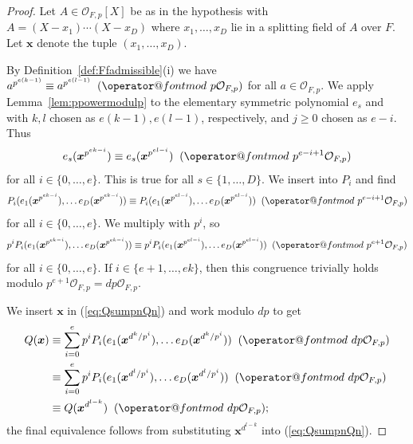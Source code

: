 \documentclass[12pt,oneside,a4]{amsart}
\makeatletter
\newcommand{\cO}{\mathcal{O}}
\numberwithin{maincounter}{section}
\numberwithin{equation}{section}
\def\imod#1{\allowbreak\mkern10mu({\operator@font mod}\,\,#1)}
\makeatother
\begin{document}
\begin{proof}
  Let $A\in \mathcal{O}_{F,p}[X]$ be  as in the hypothesis
  with $A = (X-x_1)\cdots(X-x_D)$
  where $x_1,\ldots,x_D$ lie in a splitting field of $A$ over $F$.
  Let $\boldsymbol x$ denote the tuple $(x_1,\ldots,x_D)$.
  
  By Definition~\ref{def:Ffadmissible}(i) we have
  $a^{p^{e(k-1)}}\equiv a^{p^{e(l-1)}} \imod {p\cO_{F,p}}$ for
  all $a\in \cO_{F,p}$. We apply Lemma~\ref{lem:ppowermodulp}  to the
  elementary symmetric polynomial $e_s$ and with $k,l$ chosen
  as $e(k-1),e(l-1)$, respectively, and $j\ge 0$ chosen as $e-i$.  Thus 
  \begin{equation*}
    e_s(\boldsymbol x^{p^{ek-i}})
    \equiv
    e_s(\boldsymbol x^{p^{el-i}})
    \imod{p^{e-i+1}\cO_{F,p}}
  \end{equation*}
  for all $i\in \{0,\ldots,e\}$. This is true for
  all $s\in \{1,\ldots,D\}$. We
  insert into $P_i$ and find
  \begin{equation*}
    P_i(e_1(\boldsymbol x^{p^{ek-i}}), \ldots e_D(\boldsymbol
    x^{p^{ek-i}}))
    \equiv
    P_i(e_1(\boldsymbol x^{p^{el-i}}), \ldots e_D(\boldsymbol
    x^{p^{el-i}}))
    \imod{p^{e-i+1}\cO_{F,p}}
  \end{equation*}
  for all $i\in \{0,\ldots,e\}$. We multiply with $p^i$, so
  \begin{equation*}
    p^i P_i(e_1(\boldsymbol x^{p^{ek-i}}), \ldots e_D(\boldsymbol
    x^{p^{ek-i}}))
    \equiv
    p^iP_i(e_1(\boldsymbol x^{p^{el-i}}), \ldots e_D(\boldsymbol
    x^{p^{el-i}}))
    \imod{p^{e+1}\cO_{F,p}}
  \end{equation*}
  for all $i \in \{0,\ldots,e\}$.  If $i \in \{e+1,\ldots,ek\}$, then this congruence
   trivially holds modulo
   $p^{e+1}\cO_{F,p}=dp\cO_{F,p}$.
 
  We insert $\boldsymbol{x}$ in
  (\ref{eq:QsumpnQn}) and work modulo $dp$ to get
  \begin{equation}
    \label{eq:QxQxdlk}
    \begin{aligned}
    Q(\boldsymbol x) &\equiv
    \sum_{i=0}^{e} p^i P_i(e_1(\boldsymbol
    x^{d^k/p^i}), \ldots e_D(\boldsymbol
    x^{d^k/p^i})) \imod{dp \cO_{F,p}} \\
    &\equiv\sum_{i=0}^{e} p^i P_i(e_1(\boldsymbol
    x^{d^l/p^i}), \ldots e_D(\boldsymbol
      x^{d^l/p^i})) \imod{dp \cO_{F,p}} \\
    &\equiv Q(\boldsymbol x^{d^{l-k}})\imod{dp \cO_{F,p}}; 
    \end{aligned}
  \end{equation}  
  the final equivalence follows from substituting
  ${\boldsymbol x}^{d^{l-k}}$ into  (\ref{eq:QsumpnQn}).


\end{proof}
\end{document}
